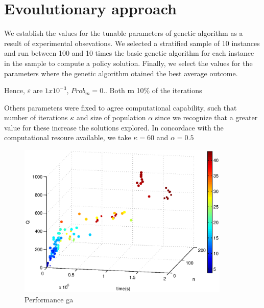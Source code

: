 \section{Evoulutionary approach}

We establish the values for the tunable parameters of genetic algorithm as a result of experimental obsevations. We selected a stratified sample of 10 instances and run between 100 and 10 times the basic genetic algorithm for each instance in the sample to compute a policy solution. Finally, we select the values for the parameters where the genetic algorithm otained the best average outcome.

Hence, $\varepsilon$ are $1x10^{-3}$, $Prob_m = 0.$.  Both $\mathbf{m}$ 10\% of the iterations 

Others parameters were fixed to agree computational capability, such that  number of iterations $\kappa$ and size of population $\alpha$ since we recognize that a greater value for these increase the solutions explored. In concordace with the computational resoure available, we take $\kappa = 60$ and $\alpha = 0.5$



\begin{figure}[!htbp]
  \begin{center}
   \includegraphics[width=0.9\textwidth]{Images/Chapter5/compare_expected_distance_ga.eps}
  \end{center}
    \caption{Performance ga}\label{fig:compare_expected_distance_ga}
\end{figure}

